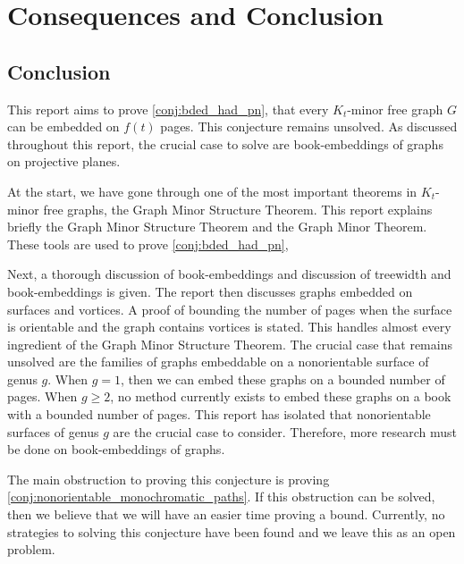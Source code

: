 \chapter{Consequences and Conclusion}\label{chap:conclusion}



\section{Conclusion}
This report aims to prove \cref{conj:bded_had_pn}, that every $K_t$-minor free graph $G$ can be embedded on $f(t)$ pages. This conjecture remains unsolved. 
As discussed throughout this report, the crucial case to solve are book-embeddings of graphs on projective planes. 

At the start, we have gone through one of the most important theorems in $K_t$-minor free graphs, the Graph Minor Structure Theorem. This report explains briefly the Graph Minor Structure Theorem and the Graph Minor Theorem. 
These tools are used to prove \cref{conj:bded_had_pn},

Next, a thorough discussion of book-embeddings and discussion of treewidth and book-embeddings is given. The report then discusses graphs embedded on surfaces and vortices. A proof of bounding the number of pages when the surface is orientable and the graph contains vortices is stated. This handles almost every ingredient of the Graph Minor Structure Theorem. The crucial case that remains unsolved are the families of graphs embeddable on a nonorientable surface of genus $g$. When $g = 1$, then we can embed these graphs on a bounded number of pages. When $g \geq 2$, no method currently exists to embed these graphs on a book with a bounded number of pages. This report has isolated that nonorientable surfaces of genus $g$ are the crucial case to consider. Therefore, more research must be done on book-embeddings of graphs. 

The main obstruction to proving this conjecture is proving \cref{conj:nonorientable_monochromatic_paths}. If this obstruction can be solved, then we believe that we will have an easier time proving a bound. Currently, no strategies to solving this conjecture have been found and we leave this as an open problem. 

